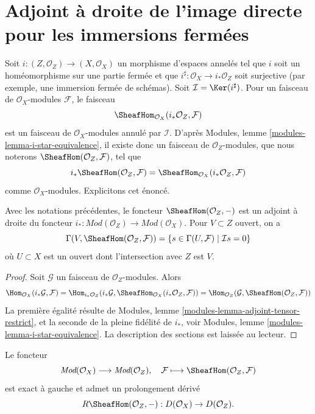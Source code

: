\section{Adjoint à droite de l'image directe pour les immersions fermées}
\label{section-sections-with-exact-support}

\noindent
Soit $i : (Z, \mathcal{O}_Z) \to (X, \mathcal{O}_X)$ un morphisme d'espaces annelés tel que $i$ soit un homéomorphisme sur une partie fermée et que $i^\sharp : \mathcal{O}_X \to i_*\mathcal{O}_Z$ soit surjective (par exemple, une immersion fermée de schémas). Soit $\mathcal{I} = \Ker(i^\sharp)$. Pour un faisceau de $\mathcal{O}_X$-modules $\mathcal{F}$, le faisceau
$$
\SheafHom_{\mathcal{O}_X}(i_*\mathcal{O}_Z, \mathcal{F})
$$
est un faisceau de $\mathcal{O}_X$-modules annulé par $\mathcal{I}$. D'après Modules, lemme \ref{modules-lemma-i-star-equivalence}, il existe donc un faisceau de $\mathcal{O}_Z$-modules, que nous noterons $\SheafHom(\mathcal{O}_Z, \mathcal{F})$, tel que
$$
i_*\SheafHom(\mathcal{O}_Z, \mathcal{F}) =
\SheafHom_{\mathcal{O}_X}(i_*\mathcal{O}_Z, \mathcal{F})
$$
comme $\mathcal{O}_X$-modules. Explicitons cet énoncé.

\begin{lemma}
\label{lemma-compute-sheaf-with-exact-support}
Avec les notations précédentes, le foncteur $\SheafHom(\mathcal{O}_Z, -)$ est un adjoint à droite du foncteur $i_* : \textit{Mod}(\mathcal{O}_Z) \to \textit{Mod}(\mathcal{O}_X)$. Pour $V \subset Z$ ouvert, on a
$$
\Gamma(V, \SheafHom(\mathcal{O}_Z, \mathcal{F})) =
\{s \in \Gamma(U, \mathcal{F}) \mid \mathcal{I}s = 0\}
$$
où $U \subset X$ est un ouvert dont l'intersection avec $Z$ est $V$.
\end{lemma}

\begin{proof}
Soit $\mathcal{G}$ un faisceau de $\mathcal{O}_Z$-modules. Alors
$$
\Hom_{\mathcal{O}_X}(i_*\mathcal{G}, \mathcal{F}) =
\Hom_{i_*\mathcal{O}_Z}(i_*\mathcal{G},
\SheafHom_{\mathcal{O}_X}(i_*\mathcal{O}_Z, \mathcal{F})) =
\Hom_{\mathcal{O}_Z}(\mathcal{G}, \SheafHom(\mathcal{O}_Z, \mathcal{F}))
$$
La première égalité résulte de Modules, lemme \ref{modules-lemma-adjoint-tensor-restrict}, et la seconde de la pleine fidélité de $i_*$, voir Modules, lemme \ref{modules-lemma-i-star-equivalence}. La description des sections est laissée au lecteur.
\end{proof}

\noindent
Le foncteur
$$
\textit{Mod}(\mathcal{O}_X)
\longrightarrow
\textit{Mod}(\mathcal{O}_Z),
\quad
\mathcal{F} \longmapsto \SheafHom(\mathcal{O}_Z, \mathcal{F})
$$
est exact à gauche et admet un prolongement dérivé
$$
R\SheafHom(\mathcal{O}_Z, -) : D(\mathcal{O}_X) \to D(\mathcal{O}_Z).
$$

